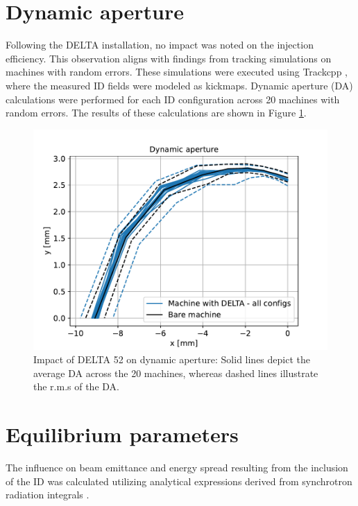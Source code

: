 \documentclass[a4paper,
               keeplastbox,   %
               ]{jacow}
\begin{document}
\section{Dynamic aperture}

Following the DELTA installation, no impact was noted on the injection efficiency. This observation aligns with findings from tracking simulations on machines with random errors. These simulations were executed using Trackcpp \cite{Trackcpp}, where the measured ID fields were modeled as kickmaps. Dynamic aperture (DA) calculations were performed for each ID configuration across 20 machines with random errors. The results of these calculations are shown in Figure \ref{fig:dynapt}.


\begin{figure}[!h]
    \centering
   \includegraphics[width=0.95\columnwidth]{dynapt.pdf}
   \caption{Impact of DELTA 52 on dynamic aperture: Solid lines depict the average  DA across the 20 machines, whereas dashed lines illustrate the r.m.s of the DA.}
   \label{fig:dynapt}
\end{figure}

\section{Equilibrium parameters}
The influence on beam emittance and energy spread resulting from the inclusion of the ID was calculated utilizing analytical expressions derived from synchrotron radiation integrals \cite{Lee:1999}.
\end{document}
